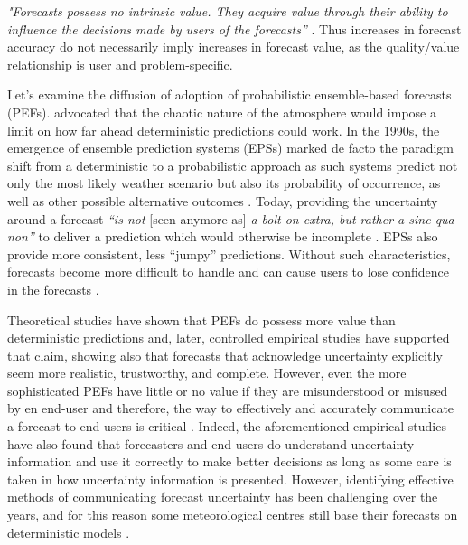 \textit{"Forecasts possess no intrinsic value. They acquire value through their ability to influence the decisions made by users of the forecasts”} \citep{Murphy1993}. Thus increases in forecast accuracy do not necessarily imply increases in forecast value, as the quality/value relationship is user and problem-specific. \par
Let's examine the diffusion of adoption of probabilistic ensemble-based forecasts (PEFs). \citet{Lorenz1963} advocated that the chaotic nature of the atmosphere would impose a limit on how far ahead deterministic predictions could work. In the 1990s, the emergence of ensemble prediction systems (EPSs) marked de facto the paradigm shift from a deterministic to a probabilistic approach as such systems predict not only the most likely weather scenario but also its probability of occurrence, as well as other possible alternative outcomes \citep{Bauer2015,Buizza2018a,Palmer2019}. Today, providing the uncertainty around a forecast \textit{“is not} [seen anymore as] \textit{a bolt-on extra, but rather a sine qua non”} to deliver a prediction which would otherwise be incomplete \citep{Palmer2017}. EPSs also provide more consistent, less “jumpy” predictions. Without such characteristics, forecasts become more difficult to handle and can cause users to lose confidence in the forecasts \citep{Richardson2020}. \par
Theoretical studies \citep{Richardson2000,Richardson2001,Palmer2002,Zhu2002,Buizza2008} have shown that PEFs do possess more value than deterministic predictions and, later, controlled empirical studies \citep{Roulston2006,Joslyn2007,Roulston2009,Joslyn2010,Joslyn2012,Joslyn2013,Ramos2013,Arnal2016} have supported that claim, showing also that forecasts that acknowledge uncertainty explicitly seem more realistic, trustworthy, and complete. However, even the more sophisticated PEFs have little or no value if they are misunderstood or misused by en end-user and therefore, the way to effectively and accurately communicate a forecast to end-users is critical \citep{Du2007}. Indeed, the aforementioned empirical studies have also found that forecasters and end-users do understand uncertainty information and use it correctly to make better decisions as long as some care is taken in how uncertainty information is presented. However, identifying effective methods of communicating forecast uncertainty has been challenging over the years, and for this reason some meteorological centres still base their forecasts on deterministic models \citep{NationalResearchCouncil2006,AMS2008}. \par
